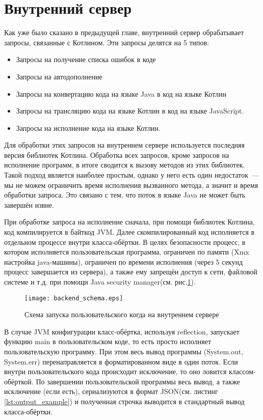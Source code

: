 \section{Внутренний сервер}
	Как уже было сказано в предыдущей главе, внутренний
сервер обрабатывает запросы, связанные с Котлином. Эти запросы делятся на 5 типов:
\begin{itemize}
	\item Запросы на получение списка ошибок в коде
	\item Запросы на автодополнение
	\item Запросы на конвертацию кода на языке Java в код на языке Котлин
	\item Запросы на трансляцию кода на языке  Котлин в код на языке Java\-Script.
	\item Запросы на исполнение кода на языке Котлин.
\end{itemize}
	Для обработки этих запросов на внутреннем сервере используется последняя версия библиотек Котлина. Обработка всех запросов, кроме запросов на исполнение программ, в итоге сводится к вызову методов из этих библиотек. Такой подход является наиболее простым, однако у него есть один недостаток~--- мы не можем ограничить время исполнения вызванного метода, а значит и время обработки запроса. Это связано с тем, что поток в языке Java не может быть завершён извне. 
	
	При обработке запроса на исполнение сначала, при помощи библиотек Котлина, код компилируется в байткод JVM. Далее скомпилированный код исполняется в отдельном процессе внутри класса-обёртки. В целях безопасности	процесс, в котором исполняется пользовательская программа, ограничен по памяти (Xmx настройка java-машины), ограничен по времени исполнения (через 5 секунд процесс завершается из сервера), а также ему запрещён доступ к сети, файловой системе и т.д. при помощи Java security manager(см. рис.\ref{fig:backend_schema}).
	
\begin{figure}[ht]
	\begin{center}
		\texttt{[image: backend\_schema.eps]}
	\end{center}
	\caption{ Схема запуска пользовательского когда на внутреннем сервере}
	\label{fig:backend_schema}
\end{figure}
	
	В случае JVM конфигурации класс-обёртка, используя reflection, запускает функцию main в пользовательском коде, то есть просто исполняет пользовательскую программу. При этом весь вывод программы (System.out,  Sys\-tem.err) перенаправляется в форматированном виде в один поток. Если внутри пользовательского кода происходит исключение, то оно ловится классом-обёрткой. По завершении пользовательской программы весь вывод, а также исключение (если есть), сериализуются в формат JSON(см. листинг \ref{lst:output_example}) и полученная строчка выводится в стандартный вывод класса-обёртки.
	
